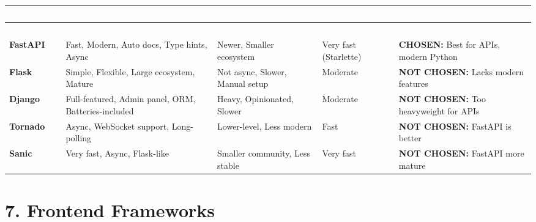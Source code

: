 \documentclass[12pt,a4paper,landscape]{article}
\begin{document}
\begin{longtable}{|p{2.5cm}|p{3cm}|p{3cm}|p{3cm}|p{4cm}|}
\hline
\rowcolor{headercolor}
\textcolor{white}{\textbf{Framework}} & 
\textcolor{white}{\textbf{Pros}} & 
\textcolor{white}{\textbf{Cons}} & 
\textcolor{white}{\textbf{Performance}} & 
\textcolor{white}{\textbf{Why Chosen/Not}} \\
\hline
\endfirsthead

\hline
\rowcolor{headercolor}
\textcolor{white}{\textbf{Framework}} & 
\textcolor{white}{\textbf{Pros}} & 
\textcolor{white}{\textbf{Cons}} & 
\textcolor{white}{\textbf{Performance}} & 
\textcolor{white}{\textbf{Why Chosen/Not}} \\
\hline
\endhead

\rowcolor{rowcolor1}
\textbf{FastAPI} & 
Fast, Modern, Auto docs, Type hints, Async & 
Newer, Smaller ecosystem & 
Very fast (Starlette) & 
\textbf{CHOSEN:} Best for APIs, modern Python \\
\hline

\rowcolor{rowcolor2}
\textbf{Flask} & 
Simple, Flexible, Large ecosystem, Mature & 
Not async, Slower, Manual setup & 
Moderate & 
\textbf{NOT CHOSEN:} Lacks modern features \\
\hline

\rowcolor{rowcolor1}
\textbf{Django} & 
Full-featured, Admin panel, ORM, Batteries-included & 
Heavy, Opinionated, Slower & 
Moderate & 
\textbf{NOT CHOSEN:} Too heavyweight for APIs \\
\hline

\rowcolor{rowcolor2}
\textbf{Tornado} & 
Async, WebSocket support, Long-polling & 
Lower-level, Less modern & 
Fast & 
\textbf{NOT CHOSEN:} FastAPI is better \\
\hline

\rowcolor{rowcolor1}
\textbf{Sanic} & 
Very fast, Async, Flask-like & 
Smaller community, Less stable & 
Very fast & 
\textbf{NOT CHOSEN:} FastAPI more mature \\
\hline
\end{longtable}

\newpage

\section*{7. Frontend Frameworks}
\end{document}
